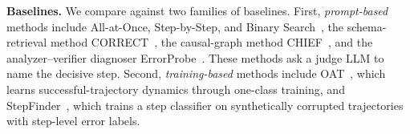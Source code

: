 

\textbf{Baselines.} We compare \soap against two families of baselines. First, \emph{prompt-based} methods include All-at-Once, Step-by-Step, and Binary Search~\citep{whoandwhen}, the schema-retrieval method CORRECT~\citep{correct}, the causal-graph method CHIEF~\citep{chief}, and the analyzer--verifier diagnoser ErrorProbe~\citep{errorprobe}. These methods ask a judge LLM to name the decisive step. Second, \emph{training-based} methods include OAT~\citep{oat}, which learns successful-trajectory dynamics through one-class training, and StepFinder~\citep{zhu2026stepfinder}, which trains a step classifier on synthetically corrupted trajectories with step-level error labels.


